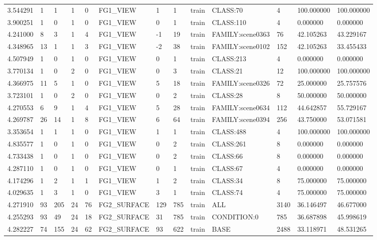 \begin{tabular}{lllllllllllll}
3.544291 & 1 & 1 & 1 & 0 & FG1\_VIEW & 1 & 1 & train & CLASS:70 & 4 & 100.000000 & 100.000000 \\
3.900251 & 1 & 0 & 1 & 0 & FG1\_VIEW & 0 & 1 & train & CLASS:110 & 4 & 0.000000 & 0.000000 \\
4.241000 & 8 & 3 & 1 & 4 & FG1\_VIEW & -1 & 19 & train & FAMILY:scene0363 & 76 & 42.105263 & 43.229167 \\
4.348965 & 13 & 1 & 1 & 3 & FG1\_VIEW & -2 & 38 & train & FAMILY:scene0102 & 152 & 42.105263 & 33.455433 \\
4.507949 & 1 & 0 & 1 & 0 & FG1\_VIEW & 0 & 1 & train & CLASS:213 & 4 & 0.000000 & 0.000000 \\
3.770134 & 1 & 0 & 2 & 0 & FG1\_VIEW & 0 & 3 & train & CLASS:21 & 12 & 100.000000 & 100.000000 \\
4.366975 & 11 & 5 & 1 & 0 & FG1\_VIEW & 5 & 18 & train & FAMILY:scene0326 & 72 & 25.000000 & 25.757576 \\
3.723101 & 1 & 0 & 2 & 0 & FG1\_VIEW & 0 & 2 & train & CLASS:28 & 8 & 50.000000 & 50.000000 \\
4.270553 & 6 & 9 & 1 & 4 & FG1\_VIEW & 5 & 28 & train & FAMILY:scene0634 & 112 & 44.642857 & 55.729167 \\
4.269787 & 26 & 14 & 1 & 8 & FG1\_VIEW & 6 & 64 & train & FAMILY:scene0394 & 256 & 43.750000 & 53.071581 \\
3.353654 & 1 & 1 & 1 & 0 & FG1\_VIEW & 1 & 1 & train & CLASS:488 & 4 & 100.000000 & 100.000000 \\
4.835577 & 1 & 0 & 1 & 0 & FG1\_VIEW & 0 & 2 & train & CLASS:261 & 8 & 0.000000 & 0.000000 \\
4.733438 & 1 & 0 & 1 & 0 & FG1\_VIEW & 0 & 2 & train & CLASS:66 & 8 & 0.000000 & 0.000000 \\
4.287110 & 1 & 0 & 1 & 0 & FG1\_VIEW & 0 & 1 & train & CLASS:67 & 4 & 0.000000 & 0.000000 \\
4.174296 & 1 & 2 & 1 & 1 & FG1\_VIEW & 1 & 2 & train & CLASS:34 & 8 & 75.000000 & 75.000000 \\
4.029635 & 1 & 3 & 1 & 0 & FG1\_VIEW & 3 & 1 & train & CLASS:74 & 4 & 75.000000 & 75.000000 \\
4.271910 & 93 & 205 & 24 & 76 & FG2\_SURFACE & 129 & 785 & train & ALL & 3140 & 36.146497 & 46.677000 \\
4.255293 & 93 & 49 & 24 & 18 & FG2\_SURFACE & 31 & 785 & train & CONDITION:0 & 785 & 36.687898 & 45.998619 \\
4.282227 & 74 & 155 & 24 & 62 & FG2\_SURFACE & 93 & 622 & train & BASE & 2488 & 33.118971 & 48.531265 \\

\end{tabular}
